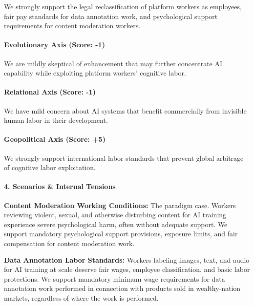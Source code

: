 We strongly support the legal reclassification of platform workers as
employees, fair pay standards for data annotation work, and
psychological support requirements for content moderation workers.

\paragraph{Evolutionary Axis (Score:
-1)}\label{evolutionary-axis-score--1-6}

We are mildly skeptical of enhancement that may further concentrate AI
capability while exploiting platform workers' cognitive labor.

\paragraph{Relational Axis (Score:
-1)}\label{relational-axis-score--1-6}

We have mild concern about AI systems that benefit commercially from
invisible human labor in their development.

\paragraph{Geopolitical Axis (Score:
+5)}\label{geopolitical-axis-score-5-3}

We strongly support international labor standards that prevent global
arbitrage of cognitive labor exploitation.

\paragraph{4. Scenarios \& Internal
Tensions}\label{scenarios-internal-tensions-41}

\textbf{Content Moderation Working Conditions:} The paradigm case.
Workers reviewing violent, sexual, and otherwise disturbing content for
AI training experience severe psychological harm, often without adequate
support. We support mandatory psychological support provisions, exposure
limits, and fair compensation for content moderation work.

\textbf{Data Annotation Labor Standards:} Workers labeling images, text,
and audio for AI training at scale deserve fair wages, employee
classification, and basic labor protections. We support mandatory
minimum wage requirements for data annotation work performed in
connection with products sold in wealthy-nation markets, regardless of
where the work is performed.

